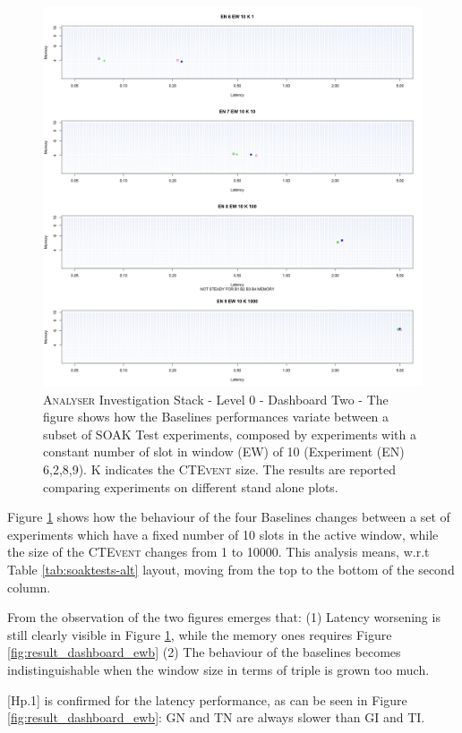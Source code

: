 \begin{figure}[h|tbp]
	\centering
	\includegraphics[width=0.80\linewidth]{images/dashboard-2-split}	
	\caption[\textsc{Analyser} Investigation Stack - Level 0 - Dashboard Two - Split Version]{\textsc{Analyser} Investigation Stack - Level 0 - Dashboard Two - The figure shows how the Baselines performances variate between a subset of SOAK Test experiments, composed by experiments with a constant number of slot in window (EW) of 10 (Experiment (EN) 6,2,8,9). K indicates the \textsc{CTEvent} size. The results are reported comparing experiments on different stand alone plots.}
	\label{fig:result_dashboard_ewa}
\end{figure}




Figure \ref{fig:result_dashboard_ewa} shows how the behaviour of the four Baselines changes between a set of experiments which have a fixed number of 10 slots in the active window, while the size of the \textsc{CTEvent} changes from 1 to 10000. This analysis means, w.r.t Table \ref{tab:soaktests-alt} layout, moving from the top to the bottom of the second column.

From the observation of the two figures emerges that: (1) Latency worsening is still clearly visible in Figure \ref{fig:result_dashboard_ewa}, while the memory ones requires Figure \ref{fig:result_dashboard_ewb} (2) The behaviour of the baselines becomes indistinguishable when the window size in terms of triple is grown too much. 

[Hp.1] is confirmed for the latency performance, as can be seen in Figure \ref{fig:result_dashboard_ewb}: GN and TN are always slower than GI and TI. 

